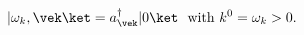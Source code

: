 \begin{equation}
   |\omega_k , \vek \ket = a^{\dagger}_{\vek} | 0 \ket \ \ {\rm
   with} \ k^0 = \omega_k >0.
\end{equation}

